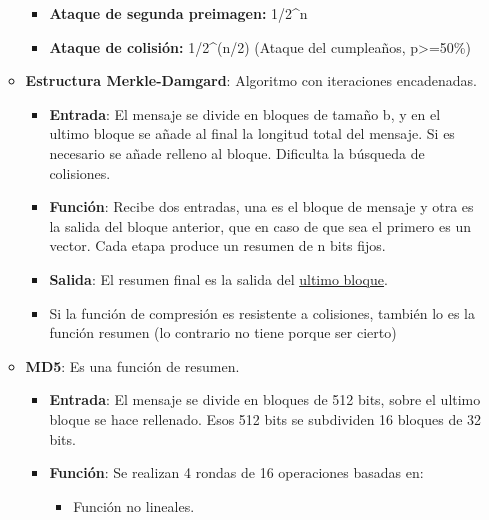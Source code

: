 \documentclass[12pt, twoside, openright]{report} %
\begin{document}
\begin{itemize}
\begin{itemize}
\begin{itemize}
      \item \textbf{Ataque de segunda preimagen:} 1/2\^{}n
        
      \item \textbf{Ataque de colisión:} 1/2\^{}(n/2) (Ataque del
        cumpleaños, p\textgreater=50\%)
        
      \end{itemize}
    \item \textbf{Estructura Merkle-Damgard}: Algoritmo con iteraciones
      encadenadas.
      

      \begin{itemize}
      \item \textbf{Entrada}: El mensaje se divide en bloques de tamaño b, y
        en el ultimo bloque se añade al final la longitud total del
        mensaje. Si es necesario se añade relleno al bloque. Dificulta
        la búsqueda de colisiones.
        
      \item \textbf{Función}: Recibe dos entradas, una es el bloque de
        mensaje y otra es la salida del bloque anterior, que en caso de
        que sea el primero es un vector. Cada etapa produce un resumen
        de n bits fijos.
        
      \item \textbf{Salida}: El resumen final es la salida del
        \underline{ultimo bloque}.
        
      \item Si la función de compresión es resistente a colisiones, también
        lo es la función resumen (lo contrario no tiene porque ser
        cierto)
        
      \end{itemize}
    \item \textbf{MD5}: Es una función de resumen.
      

      \begin{itemize}
      \item \textbf{Entrada}: El mensaje se divide en bloques de 512 bits,
        sobre el ultimo bloque se hace rellenado. Esos 512 bits se
        subdividen 16 bloques de 32 bits.
        
      \item \textbf{Función}: Se realizan 4 rondas de 16 operaciones basadas
        en:
        

        \begin{itemize}
        \item Función no lineales.
          

\end{itemize}
\end{itemize}
\end{itemize}
\end{itemize}
\end{document}
